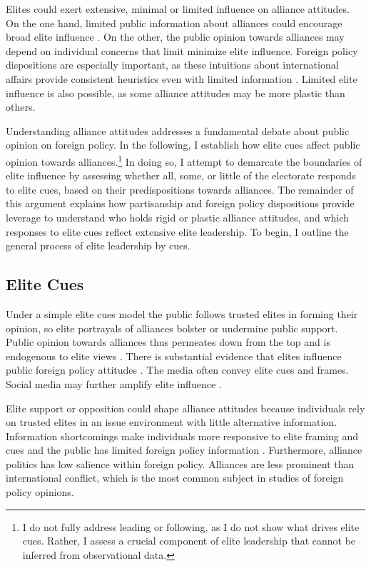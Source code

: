 \documentclass[12pt]{article}
\begin{document}
Elites could exert extensive, minimal or limited influence on alliance attitudes. 
On the one hand, limited public information about alliances could encourage broad elite influence \citep{Druckman2001}. 
On the other, the public opinion towards alliances may depend on individual concerns that limit minimize elite influence.
Foreign policy dispositions are especially important, as these intuitions about international affairs provide consistent heuristics even with limited information \citep{Herrmannetal2009, KertzerZeitzoff2017}.
Limited elite influence is also possible, as some alliance attitudes may be more plastic than others.  


Understanding alliance attitudes addresses a fundamental debate about public opinion on foreign policy.  
In the following, I establish how elite cues affect public opinion towards alliances.\footnote{I do not fully address leading or following, as I do not show what drives elite cues. Rather, I assess a crucial component of elite leadership that cannot be inferred from observational data.}
In doing so, I attempt to demarcate the boundaries of elite influence by assessing whether all, some, or little of the electorate responds to elite cues, based on their predispositions towards alliances.
The remainder of this argument explains how partisanship and foreign policy dispositions provide leverage to understand who holds rigid or plastic alliance attitudes, and which responses to elite cues reflect extensive elite leadership. 
To begin, I outline the general process of elite leadership by cues. 


\subsection{Elite Cues} 


Under a simple elite cues model the public follows trusted elites in forming their opinion, so elite portrayals of alliances bolster or undermine public support.
Public opinion towards alliances thus permeates down from the top and is endogenous to elite views \citep{Druckman2014}.
There is substantial evidence that elites influence public foreign policy attitudes \citep{BaumPotter2008}. 
The media often convey elite cues and frames.
Social media may further amplify elite influence \citep{BaumPotter2019}.   


Elite support or opposition could shape alliance attitudes because individuals rely on trusted elites in an issue environment with little alternative information. 
Information shortcomings make individuals more responsive to elite framing and cues \citep{Druckman2001, Peterson2017} and the public has limited foreign policy information \citep{BaumPotter2008}.
Furthermore, alliance politics has low salience within foreign policy. 
Alliances are less prominent than international conflict, which is the most common subject in studies of foreign policy opinions. 
\end{document}
